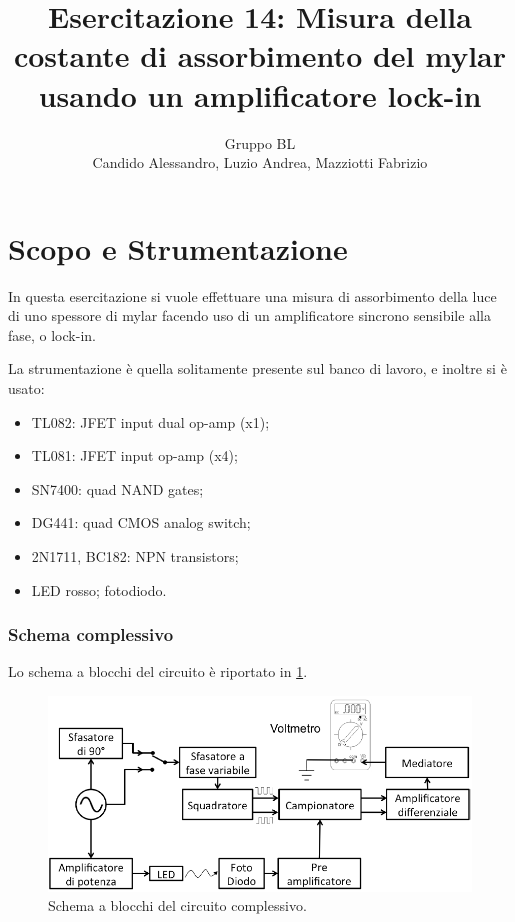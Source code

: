 \documentclass[a4paper,10pt]{article}
\title{Esercitazione 14: Misura della costante di assorbimento del mylar\\ usando un
	amplificatore lock-in}
\author{Gruppo BL \\ Candido Alessandro, Luzio Andrea, Mazziotti Fabrizio}
\begin{document}
\maketitle

\section{Scopo e Strumentazione}
In questa esercitazione si vuole effettuare una misura di assorbimento della luce di uno spessore di mylar facendo uso di un amplificatore sincrono sensibile alla fase, o lock-in.
\newline

\noindent La strumentazione è quella solitamente presente sul banco di lavoro, e inoltre si è usato:
\begin{itemize}
	\item TL082: JFET input dual op-amp (x1);
	\item TL081: JFET input op-amp (x4);
	\item SN7400: quad NAND gates;
	\item DG441: quad CMOS analog switch;
	\item 2N1711, BC182: NPN transistors;
	\item LED rosso; fotodiodo.
\end{itemize}

\subsubsection*{Schema complessivo}

Lo schema a blocchi del circuito è riportato in \cref{fig:blocks}.

\begin{figure}[H]
	\centering
	\includegraphics[width=\textwidth]{../grafici/Blocks.png}
	\vspace*{10pt}
	\caption{Schema a blocchi del circuito complessivo.}
	\label{fig:blocks}
\end{figure}
\end{document}
